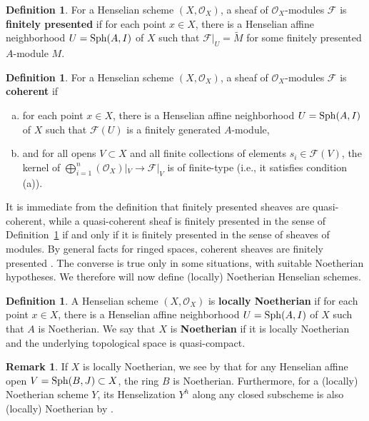 \documentclass[12pt]{article}
\renewcommand{\O}{\mathscr{O}}
\newcommand{\F}{\mathcal{F}}
\newcommand{\sph}{{\rm Sph}}
\newcommand{\spcite}[2]{\cite[\href{https://stacks.math.columbia.edu/tag/#1}{{#2} {#1}}]{stackp}}
\theoremstyle{definition}
\newtheorem{definition}[theorem]{Definition}
\newtheorem{remark}[theorem]{Remark}
\numberwithin{equation}{subsection}
\begin{document}
\begin{definition}\label{def:fpresshf} For a Henselian scheme $(X,\O_X)$, a sheaf of $\O_X$-modules $\F$ is {\bf finitely presented} if for each point $x \in X$, there is a Henselian affine neighborhood $U=\sph(A,I)$ of $X$ such that $\F|_U=\widetilde{M}$ for some finitely presented $A$-module $M$.
\end{definition}


\begin{definition}\label{def:cohshf} For a Henselian scheme $(X,\O_X)$, a sheaf of $\O_X$-modules $\F$ is {\bf coherent} if
\begin{enumerate}[(a)]
\item for each point $x \in X$, there is a Henselian affine neighborhood $U=\sph(A,I)$ of $X$ such that $\F(U)$ is a finitely generated $A$-module, 
\item and for all opens $V \subset X$ and all finite collections of elements $s_i \in \F(V)$, the kernel of $\bigoplus_{i=1}^n (\O_X)|_V \to \F|_V$ is of finite-type (i.e., it satisfies condition (a)).
 \end{enumerate}
\end{definition}

It is immediate from the definition that finitely presented sheaves are quasi-coherent, while a quasi-coherent sheaf is finitely presented in the sense of Definition~\ref{def:fpresshf} if and only if it is finitely presented in the sense of sheaves of modules. By general facts for ringed spaces, coherent sheaves are finitely presented \spcite{01BW}{Lemma}. The converse is true only in some situations, with suitable Noetherian hypotheses. We therefore will now define (locally) Noetherian Henselian schemes.

\begin{definition}\label{def:noethhenssch} A Henselian scheme $(X,\O_X)$ is {\bf locally Noetherian} if for each point $x \in X$, there is a Henselian affine neighborhood $U=\sph(A,I)$ of $X$ such that $A$ is Noetherian. We say that $X$ is {\bf Noetherian} if it is locally Noetherian and the underlying topological space is quasi-compact.
\end{definition}

\begin{remark}\label{rmk:noethhenssch}
If $X$ is locally Noetherian, we see by \spcite{00EO}{Lemma} that for any Henselian affine open $V=\sph(B,J) \subset X$, the ring $B$ is Noetherian. Furthermore, for a (locally) Noetherian scheme $Y$, its Henselization $Y^h$ along any closed subscheme is also (locally) Noetherian by \spcite{0AGV}{Lemma}.
\end{remark}
\end{document}

